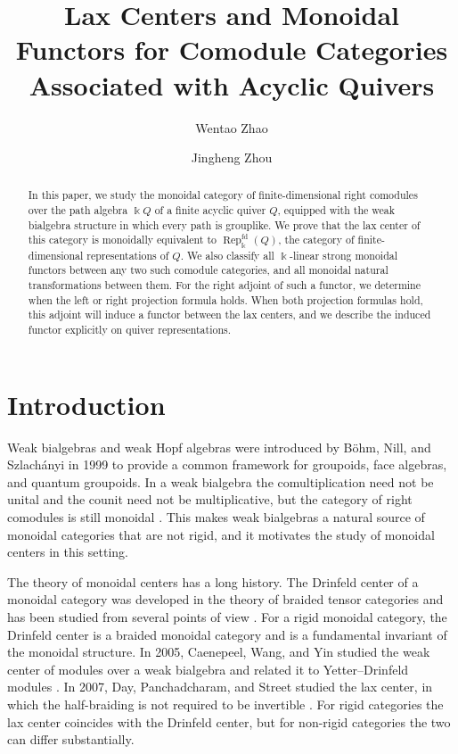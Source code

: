 \documentclass{amsart}
\title[Lax Centers and Monoidal Functors]{Lax Centers and Monoidal Functors for Comodule Categories Associated with Acyclic Quivers}
\author{Wentao Zhao}
\author{Jingheng Zhou}
\theoremstyle{definition}
\theoremstyle{remark}
\numberwithin{equation}{section}
\begin{document}
\begin{abstract}
In this paper, we study the monoidal category of finite-dimensional right comodules over the path algebra $\Bbbk Q$ of a finite acyclic quiver $Q$, equipped with the weak bialgebra structure in which every path is grouplike. We prove that the lax center of this category is monoidally equivalent to $\operatorname{Rep}^{\mathrm{fd}}_{\Bbbk}(Q)$, the category of finite-dimensional representations of $Q$. We also classify all $\Bbbk$-linear strong monoidal functors between any two such comodule categories, and all monoidal natural transformations between them. For the right adjoint of such a functor, we determine when
the left or right projection formula holds.
When both projection formulas hold, this adjoint will induce a functor between the lax centers,
 and we describe the induced functor explicitly on quiver representations.
\end{abstract}

\maketitle

\section{Introduction}

Weak bialgebras and weak Hopf algebras were introduced by B\"ohm, Nill, and
Szlach\'anyi in 1999 to provide a common framework for groupoids, face algebras,
and quantum groupoids. In a weak bialgebra the comultiplication need not be
unital and the counit need not be multiplicative, but the category of right
comodules is still monoidal \cite{bohm2011weak}. This makes weak bialgebras a natural
source of monoidal categories that are not rigid, and it motivates the study of
monoidal centers in this setting.

The theory of monoidal centers has a long history. The Drinfeld center of a
monoidal category was developed in the theory of braided tensor categories and
has been studied from several points of view
\cite{JS1993,S2001,S2004}. For a rigid monoidal category, the Drinfeld center
is a braided monoidal category and is a fundamental invariant of the monoidal
structure. In 2005, Caenepeel, Wang, and Yin studied the weak center of modules
over a weak bialgebra and related it to Yetter--Drinfeld modules
\cite{CWY2005}. In 2007, Day, Panchadcharam, and Street studied the lax center,
in which the half-braiding is not required to be invertible \cite{DPS2007}. For
rigid categories the lax center coincides with the Drinfeld center, but for
non-rigid categories the two can differ substantially.
\end{document}
